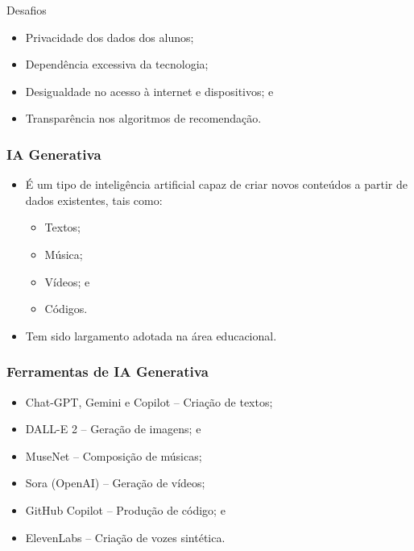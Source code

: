 \documentclass[aspectratio=169]{beamer} %
\begin{document}
\begin{frame}{Desafios}
	
	\begin{itemize}
		\item Privacidade dos dados dos alunos;
		\item Dependência excessiva da tecnologia;
		\item Desigualdade no acesso à internet e dispositivos; e
		\item Transparência nos algoritmos de recomendação.
	\end{itemize}
\end{frame}

\begin{frame}
	\frametitle{IA Generativa}
	
	\begin{itemize}
		\item É um tipo de inteligência artificial capaz de criar novos conteúdos a partir de dados existentes, tais como:
		\begin{itemize}
			\item Textos;
			\item Música;
			\item Vídeos; e
			\item Códigos.
		\end{itemize}		
		\item Tem sido largamento adotada na área educacional.
	\end{itemize}
\end{frame}

\begin{frame}
	\frametitle{Ferramentas de IA Generativa}
	
	\begin{itemize}
		\item Chat-GPT, Gemini e Copilot -- Criação de textos; 
		\item DALL-E 2 -- Geração de imagens; e
		\item MuseNet -- Composição de músicas;
		\item Sora (OpenAI) -- Geração de vídeos;
		\item GitHub Copilot -- Produção de código; e
		\item ElevenLabs -- Criação de vozes sintética.
	\end{itemize}
\end{frame}
\end{document}
